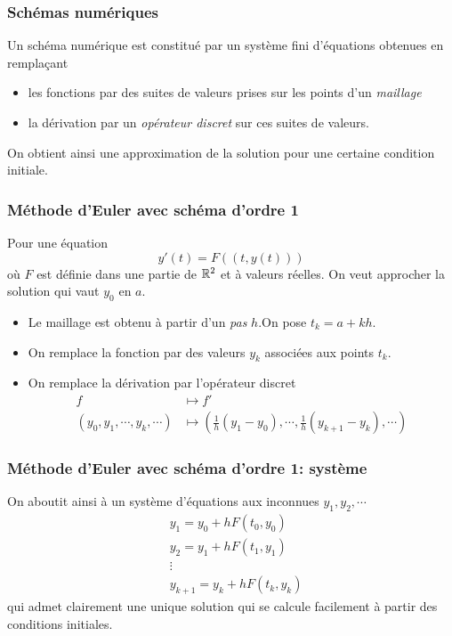 \begin{frame}
  \frametitle{Schémas numériques}
Un schéma numérique est constitué par un système fini d'équations obtenues en remplaçant 
\begin{itemize}
  \item les fonctions par des suites de valeurs prises sur les points d'un \emph{maillage}
  \item la dérivation par un \emph{opérateur discret} sur ces suites de valeurs. 
\end{itemize}
On obtient ainsi une approximation de la solution pour une certaine condition initiale.
\end{frame}

\begin{frame}
  \frametitle{Méthode d'Euler avec schéma d'ordre 1}
Pour une équation
\begin{equation*}
  y'(t) = F((t,y(t)))
  \label{euler}
\end{equation*}
où $F$ est définie dans une partie de $\mathbb{R}^2$ et à valeurs réelles.\newline
On veut approcher la solution qui vaut $y_0$ en $a$.
\begin{itemize}
  \item Le maillage est obtenu à partir d'un  \emph{pas} $h$.\newline On pose $t_k = a + kh$.
  \item On remplace la fonction par des valeurs $y_k$ associées aux points $t_k$.
  \item On remplace la dérivation par l'opérateur discret 
  \begin{align*}
  f &\mapsto f'\\
(y_0,y_1,\cdots,y_k,\cdots)&\mapsto \left(\frac{1}{h}(y_1-y_0),\cdots, \frac{1}{h}(y_{k+1}-y_k),\cdots \right)      
  \end{align*}
\end{itemize}
\end{frame}

\begin{frame}
  \frametitle{Méthode d'Euler avec schéma d'ordre 1: système}
On aboutit ainsi à un système d'équations aux inconnues $y_1,y_2,\cdots$
\begin{align*}
  &y_1 = y_0 + hF(t_0,y_0) \\ &y_2 = y_1 + hF(t_1,y_1) \\ &\vdots \\ &y_{k+1} = y_k + hF(t_k,y_k)
\end{align*}
qui admet clairement une unique solution qui se calcule facilement à partir des conditions initiales.
\end{frame}

